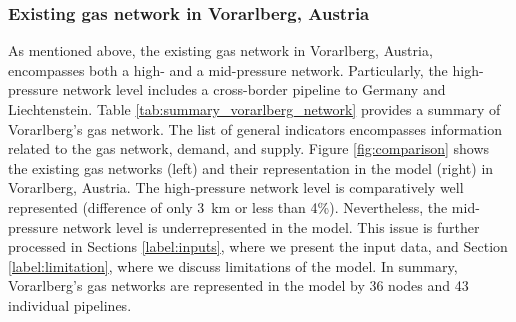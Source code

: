  \subsubsection{Existing gas network in Vorarlberg, Austria}
 As mentioned above, the existing gas network in Vorarlberg, Austria, encompasses both a high- and a mid-pressure network. Particularly, the high-pressure network level includes a cross-border pipeline to Germany and Liechtenstein.  Table \ref{tab:summary_vorarlberg_network} provides a summary of Vorarlberg's gas network. The list of general indicators encompasses information related to the gas network, demand, and supply. Figure \ref{fig:comparison} shows the existing gas networks (left) and their representation in the model (right) in Vorarlberg, Austria. The high-pressure network level is comparatively well represented (difference of only \SI{3}{km} or less than 4\%). Nevertheless, the mid-pressure network level is underrepresented in the model. This issue is further processed in Sections \ref{label:inputs}, where we present the input data, and Section \ref{label:limitation}, where we discuss limitations of the model. In summary, Vorarlberg's gas networks are represented in the model by 36 nodes and 43 individual pipelines. 
  

